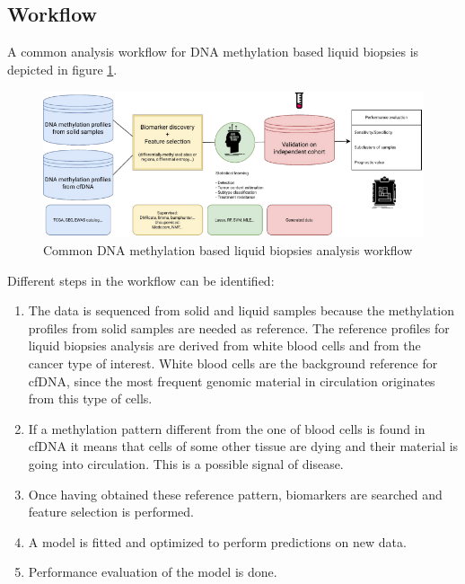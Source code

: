     \subsection{Workflow}
    A common analysis workflow for DNA methylation based liquid biopsies is depicted in figure \ref{fig:wo}.

    \begin{figure}[H]
    \centering
        \includegraphics[width=0.8\linewidth]{workflow.png}
        \caption{Common DNA methylation based liquid biopsies analysis workflow}
        \label{fig:wo}
    \end{figure}

    Different steps in the workflow can be identified:

    \begin{multicols}{2}
        \begin{enumerate}
            \item The data is sequenced from solid and liquid samples because the methylation profiles from solid samples are needed as reference.
                The reference profiles for liquid biopsies analysis are derived from white blood cells and from the cancer type of interest.
                White blood cells are the background reference for cfDNA, since the most frequent genomic material in circulation originates from this type of cells.
            \item If a methylation pattern different from the one of blood cells is found in cfDNA it means that cells of some other tissue are dying and their material is going into circulation.
                This is a possible signal of disease.
            \item Once having obtained these reference pattern, biomarkers are searched and feature selection is performed.
            \item A model is fitted and optimized to perform predictions on new data.
            \item Performance evaluation of the model is done.
        \end{enumerate}
    \end{multicols}

